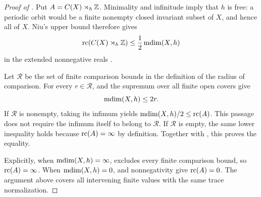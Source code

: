 \begin{proof}[Proof of ]
Put $A=C(X)\rtimes_h\mathbb Z$.
Minimality and infinitude imply that $h$ is free: a periodic
orbit would be a finite nonempty closed invariant subset of
$X$, and hence all of $X$.  Niu's upper bound therefore gives
\begin{equation}
\label{eq:final-niu-upper-bound}
 \operatorname{rc}(C(X)\rtimes_h\mathbb Z)\le\frac12\operatorname{mdim}(X,h)
\end{equation}
in the extended nonnegative reals
\cite[Theorem~5.6]{Niu2024}.

Let $\mathcal R$ be the set of finite comparison bounds in
the definition of the radius of comparison.  For every
$r\in\mathcal R$,  and the supremum
over all finite open covers give
\[
 \operatorname{mdim}(X,h)\le2r.
\]
If $\mathcal R$ is nonempty, taking its infimum yields
$\operatorname{mdim}(X,h)/2\le\operatorname{rc}(A)$.  This passage does not require
the infimum itself to belong to $\mathcal R$.  If
$\mathcal R$ is empty, the same lower inequality holds
because $\operatorname{rc}(A)=\infty$ by definition.  Together with
, this proves the equality.

Explicitly, when $\operatorname{mdim}(X,h)=\infty$,
 excludes every finite comparison
bound, so $\operatorname{rc}(A)=\infty$.  When $\operatorname{mdim}(X,h)=0$,
 and nonnegativity give
$\operatorname{rc}(A)=0$.  The argument above covers all intervening
finite values with the same trace normalization.
\end{proof}
